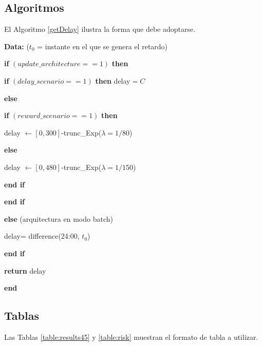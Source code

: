 {{		\subsection{Algoritmos}
		
		El Algoritmo \ref{getDelay} ilustra la forma que debe adoptarse. 
		\begin{algorithm}[h]
			{\bf  Data:} ($t_0$ = instante en el que se genera el retardo)
			\medskip
			
			\hspace{0.5em} {\bf if} $(update\_architecture==1)$ {\bf then} 
			
			\hspace{1.5em} {\bf if} $(delay\_scenario==1)$ {\bf then} delay$=C$
			
			\hspace{1.5em} {\bf else} 
			
			\hspace{2.5em} {\bf if} $(reward\_scenario==1)$ {\bf then} 
			
			\hspace{3.5em} delay $\leftarrow [0,300]$-trunc\_Exp($\lambda=1/80$)
			
			\hspace{2.5em} {\bf else} 
			
			\hspace{3.5em} delay $\leftarrow [0,480]$-trunc\_Exp($\lambda=1/150$)
			
			\hspace{2.5em} {\bf end if}
			
			\hspace{1.5em} {\bf end if}
			
			\hspace{0.5em} {\bf else} (arquitectura en modo batch)
			
			\hspace{1.5em} delay= difference(24:00, $t_0$)
			
			\hspace{0.5em} {\bf end if}
			
			\hspace{0.5em}  {\bf return} delay
			
			{\bf end} 
			\caption{$getDelay(t_0)$}
			\label{getDelay}
		\end{algorithm}
		
		
		\subsection{Tablas}
		Las Tablas \ref{table:results45} y \ref{table:risk} muestran el formato de tabla a utilizar.
		
}}
